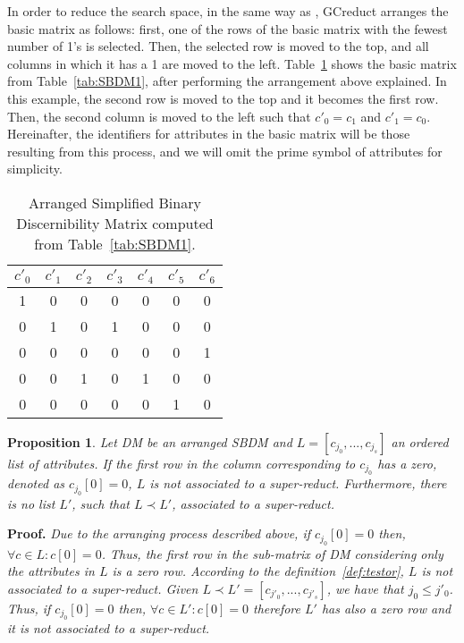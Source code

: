 \documentclass[number,preprint,review,12pt]{elsarticle}
\newtheorem{proposition}{Proposition}
\begin{document}
	\label{arrange}
	In order to reduce the search space, in the same way as \citep{Sanchez07,Lias13}, GCreduct arranges the basic matrix as follows: first, one of the rows of the basic matrix with the fewest number of 1's is selected. Then, the selected row is moved to the top, and all columns in which it has a 1 are moved to the left. Table~\ref{tab:SSBDM1} shows the basic matrix from Table~\ref{tab:SBDM1}, after performing the arrangement above explained. In this example, the second row is moved to the top and it becomes the first row. Then, the second column is moved to the left such that $c'_0 = c_1$ and $c'_1 = c_0$. Hereinafter, the identifiers for attributes in the basic matrix will be those resulting from this process, and we will omit the prime symbol of attributes for simplicity.
			
	\begin{table}[htb]
		\caption{Arranged Simplified Binary Discernibility Matrix computed from Table~\ref{tab:SBDM1}.}
		\centering
		\begin{tabular}{ccccccc}\label{tab:SSBDM1}
			$c'_0$ & $c'_1$ & $c'_2$ & $c'_3$ & $c'_4$ & $c'_5$ & $c'_6$\\
			\hline
			1&0&0&0&0&0&0\\
			0&1&0&1&0&0&0\\
			0&0&0&0&0&0&1\\
			0&0&1&0&1&0&0\\
			0&0&0&0&0&1&0\\
		\end{tabular}             
	\end{table}  
	
	\begin{proposition}\label{prop:firstRow}
		Let DM be an arranged SBDM and $L = [c_{j_0},...,c_{j_s}]$ an ordered list of attributes. If the first row in the column corresponding to $c_{j_0}$ has a zero, denoted as $c_{j_0}[0]=0$, $L$ is not associated to a super-reduct. Furthermore, there is no list $L'$, such that $L\prec L'$, associated to a super-reduct.
	\end{proposition}
	
	\noindent
	\textbf{Proof.} \textit{Due to the arranging process described above, if $c_{j_0}[0]=0$ then, $\forall c \in L: c[0]=0$. Thus, the first row in the sub-matrix of DM considering only the attributes in $L$ is a zero row. According to the definition~\ref{def:testor}, $L$ is not associated to a super-reduct. Given $L \prec L'= [c_{j'_0},...,c_{j'_s}]$, we have that $j_0 \leq j'_0$. Thus, if $c_{j_0}[0]=0$ then, $\forall c \in L': c[0]=0$ therefore $L'$ has also a zero row and it is not associated to a super-reduct.}
	
\end{document}
